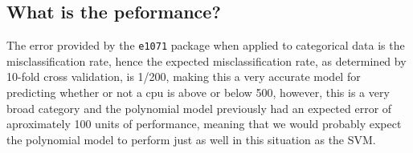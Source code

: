 \documentclass[12pt]{article}
\begin{document}
\hypertarget{what-is-the-peformance}{%
\subsection{What is the peformance?}\label{what-is-the-peformance}}

The error provided by the \texttt{e1071} package when applied to
categorical data is the misclassification rate, hence the expected
misclassification rate, as determined by 10-fold cross validation, is
1/200, making this a very accurate model for predicting whether or not a
cpu is above or below 500, however, this is a very broad category and
the polynomial model previously had an expected error of aproximately
100 units of performance, meaning that we would probably expect the
polynomial model to perform just as well in this situation as the SVM.
\end{document}
